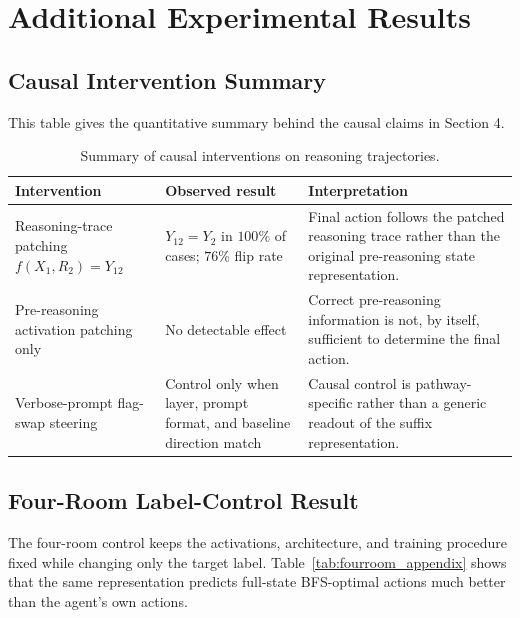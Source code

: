 \documentclass[10pt,twocolumn]{article}
\begin{document}
\section{Additional Experimental Results}

\subsection{Causal Intervention Summary}
\label{app:causal_summary}
This table gives the quantitative summary behind the causal claims in
Section 4. 

\begin{table}[htbp]
\centering
\scriptsize

\begin{tabularx}{\columnwidth}{@{}p{}p{}X@{}}
\toprule
\textbf{Intervention} & \textbf{Observed result} & \textbf{Interpretation} \\
\midrule
Reasoning-trace patching $f(X_1, R_2)=Y_{12}$ & $Y_{12}=Y_2$ in $100\%$ of cases; $76\%$ flip rate & Final action follows the patched reasoning trace rather than the original pre-reasoning state representation. \\
Pre-reasoning activation patching only & No detectable effect & Correct pre-reasoning information is not, by itself, sufficient to determine the final action. \\
Verbose-prompt flag-swap steering & Control only when layer, prompt format, and baseline direction match & Causal control is pathway-specific rather than a generic readout of the suffix representation. \\
\bottomrule
\end{tabularx}
\caption{Summary of causal interventions on reasoning trajectories.}\label{tab:causal_summary_appendix}
\end{table}

\subsection{Four-Room Label-Control Result}
\label{app:fourroom}
The four-room control keeps the activations, architecture, and training procedure fixed while changing only the target label. Table~\ref{tab:fourroom_appendix} shows that the same representation predicts full-state BFS-optimal actions much better than the agent's own actions.
\end{document}
